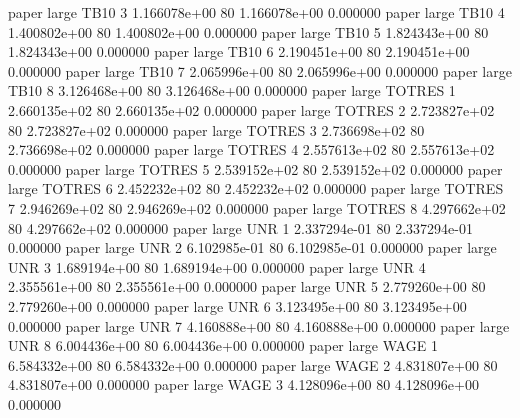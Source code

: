               paper      large     TB10                 3 1.166078e+00 80   1.166078e+00           0.000000
              paper      large     TB10                 4 1.400802e+00 80   1.400802e+00           0.000000
              paper      large     TB10                 5 1.824343e+00 80   1.824343e+00           0.000000
              paper      large     TB10                 6 2.190451e+00 80   2.190451e+00           0.000000
              paper      large     TB10                 7 2.065996e+00 80   2.065996e+00           0.000000
              paper      large     TB10                 8 3.126468e+00 80   3.126468e+00           0.000000
              paper      large   TOTRES                 1 2.660135e+02 80   2.660135e+02           0.000000
              paper      large   TOTRES                 2 2.723827e+02 80   2.723827e+02           0.000000
              paper      large   TOTRES                 3 2.736698e+02 80   2.736698e+02           0.000000
              paper      large   TOTRES                 4 2.557613e+02 80   2.557613e+02           0.000000
              paper      large   TOTRES                 5 2.539152e+02 80   2.539152e+02           0.000000
              paper      large   TOTRES                 6 2.452232e+02 80   2.452232e+02           0.000000
              paper      large   TOTRES                 7 2.946269e+02 80   2.946269e+02           0.000000
              paper      large   TOTRES                 8 4.297662e+02 80   4.297662e+02           0.000000
              paper      large      UNR                 1 2.337294e-01 80   2.337294e-01           0.000000
              paper      large      UNR                 2 6.102985e-01 80   6.102985e-01           0.000000
              paper      large      UNR                 3 1.689194e+00 80   1.689194e+00           0.000000
              paper      large      UNR                 4 2.355561e+00 80   2.355561e+00           0.000000
              paper      large      UNR                 5 2.779260e+00 80   2.779260e+00           0.000000
              paper      large      UNR                 6 3.123495e+00 80   3.123495e+00           0.000000
              paper      large      UNR                 7 4.160888e+00 80   4.160888e+00           0.000000
              paper      large      UNR                 8 6.004436e+00 80   6.004436e+00           0.000000
              paper      large     WAGE                 1 6.584332e+00 80   6.584332e+00           0.000000
              paper      large     WAGE                 2 4.831807e+00 80   4.831807e+00           0.000000
              paper      large     WAGE                 3 4.128096e+00 80   4.128096e+00           0.000000
